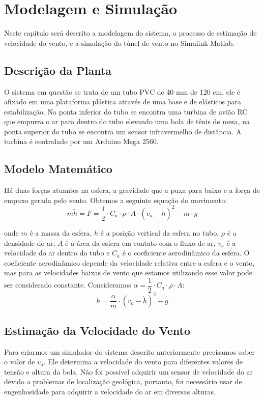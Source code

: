 \chapter{Modelagem e Simulação} \label{cap3}

Neste capítulo será descrito a modelagem do sistema, o processo de estimação de velocidade do vento, e a simulação do túnel de vento no Simulink Matlab.

\section{Descrição da Planta}
O sistema em questão se trata de um tubo PVC de 40 mm de 120 cm, ele é afixado em uma plataforma plástica através de uma base e de elásticos para estabilização. Na ponta inferior do tubo se encontra uma turbina de avião RC que empurra o ar para dentro do tubo elevando uma bola de tênis de mesa, na ponta superior do tubo se encontra um sensor infravermelho de distância. A turbina é controlado por um Arduino Mega 2560.

\section{Modelo Matemático}



\label{fig:sistemasimples}

Há duas forças atuantes na esfera, a gravidade que a puxa para baixo e a força de empuxo gerada pelo vento. Obtemos a seguinte equação do movimento:
\begin{equation}
m \ddot{h}=F=\dfrac{1}{2} \cdot C_a \cdot\rho \cdot A \cdot (v_a- \dot{h})^2-m\cdot g
\end{equation}

onde $m$ é a massa da esfera, $h$ é a posição vertical da esfera no tubo, $\rho$ é a densidade do ar, $A$ é a área da esfera em contato com o fluxo de ar, $v_a$ é a velocidade do ar dentro do tubo e $C_a$ é o coeficiente aerodinâmico da esfera. O coeficiente aerodinâmico depende da velocidade relativa entre a esfera e o vento, mas para as velocidades baixas de vento que estamos utilizando esse valor pode ser considerado constante. Consideramos $\alpha= \dfrac{1}{2} \cdot C_a \cdot \rho \cdot A$:
\begin{equation} \label{eq:modelo}
\ddot{h}=\dfrac{\alpha}{m}\cdot (v_a-\dot{h})^2-g
\end{equation}

\section{Estimação da Velocidade do Vento}
Para criarmos um simulador do sistema descrito anteriormente precisamos saber o valor de $v_a$. Ele determina a velocidade do vento para diferentes valores de tensão e altura da bola. Não foi possível adquirir um sensor de velocidade do ar devido a problemas de localização geológica, portanto, foi necessário usar de engenhosidade para adquirir a velocidade do ar em diversas alturas.


